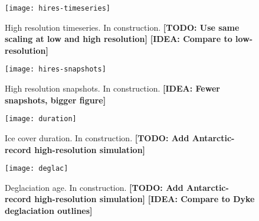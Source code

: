 \documentclass[tc, ms]{copernicus}
\def\idea#1{\textcolor[rgb]{0,0.5,0}{\textbf{[IDEA: #1]}}}
\def\todo#1{\textcolor[rgb]{0.5,0,0}{\textbf{[TODO: #1]}}}
\begin{document}
\begin{figure}
  \texttt{[image: hires-timeseries]}
  \caption{High resolution timeseries. In construction.
           \todo{Use same scaling at low and high resolution}
           \idea{Compare to low-resolution}}
  \label{fig:hires-timeseries}
\end{figure}

\begin{figure}
  \texttt{[image: hires-snapshots]}
  \caption{High resolution snapshots. In construction.
           \idea{Fewer snapshots, bigger figure}}
  \label{fig:hires-snapshots}
\end{figure}

\begin{figure}
  \texttt{[image: duration]}
  \caption{Ice cover duration. In construction.
           \todo{Add Antarctic-record high-resolution simulation}}
  \label{fig:duration}
\end{figure}

\begin{figure}
  \texttt{[image: deglac]}
  \caption{Deglaciation age. In construction.
           \todo{Add Antarctic-record high-resolution simulation}
           \idea{Compare to Dyke deglaciation outlines}}
  \label{fig:deglac}
\end{figure}

\end{document}
